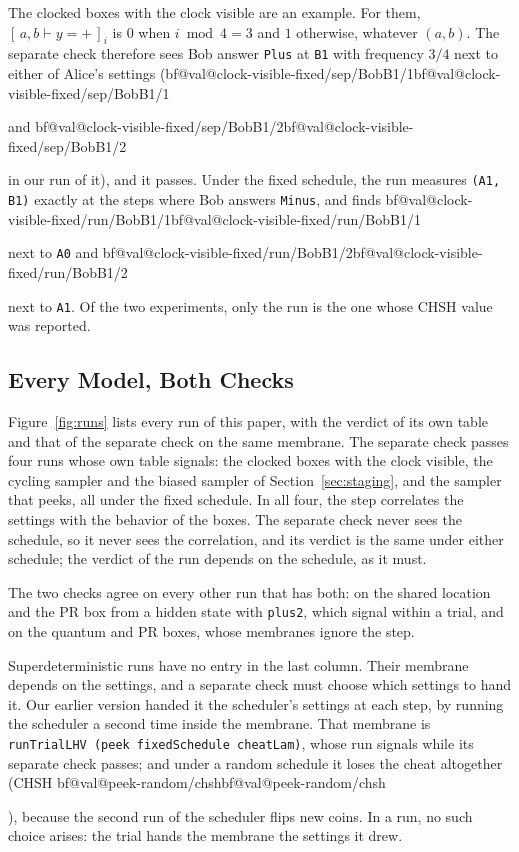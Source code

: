 \documentclass[11pt]{article}
\makeatletter
\newcommand{\hs}{\lstinline[style=hask,basicstyle=\ttfamily,frame=none]}
\newcommand{\val}[1]{\ifcsname bf@val@#1\endcsname\csname bf@val@#1\endcsname
  \else\PackageError{paper}{No value #1 in generated/values.tex}{}\fi}
\newcommand{\pr}[2]{[\,#1 \vdash #2\,]}
\newcommand{\yp}{y{=}{+}}
\makeatother
\begin{document}
The clocked boxes with the clock visible are an example. For them, $\pr{a, b}{\yp}_i$ is $0$ when $i \bmod 4 = 3$ and $1$ otherwise, whatever $(a, b)$. The separate check therefore sees Bob answer \hs|Plus| at \hs|B1| with frequency $3/4$ next to either of Alice's settings (\val{clock-visible-fixed/sep/BobB1/1} and \val{clock-visible-fixed/sep/BobB1/2} in our run of it), and it passes. Under the fixed schedule, the run measures \hs|(A1, B1)| exactly at the steps where Bob answers \hs|Minus|, and finds \val{clock-visible-fixed/run/BobB1/1} next to \hs|A0| and \val{clock-visible-fixed/run/BobB1/2} next to \hs|A1|. Of the two experiments, only the run is the one whose CHSH value was reported.

\subsection{Every Model, Both Checks}

Figure~\ref{fig:runs} lists every run of this paper, with the verdict of its own table and that of the separate check on the same membrane. The separate check passes four runs whose own table signals: the clocked boxes with the clock visible, the cycling sampler and the biased sampler of Section~\ref{sec:staging}, and the sampler that peeks, all under the fixed schedule. In all four, the step correlates the settings with the behavior of the boxes. The separate check never sees the schedule, so it never sees the correlation, and its verdict is the same under either schedule; the verdict of the run depends on the schedule, as it must.

The two checks agree on every other run that has both: on the shared location and the PR box from a hidden state with \hs|plus2|, which signal within a trial, and on the quantum and PR boxes, whose membranes ignore the step.

Superdeterministic runs have no entry in the last column. Their membrane depends on the settings, and a separate check must choose which settings to hand it. Our earlier version handed it the scheduler's settings at each step, by running the scheduler a second time inside the membrane. That membrane is \hs|runTrialLHV (peek fixedSchedule cheatLam)|, whose run signals while its separate check passes; and under a random schedule it loses the cheat altogether (CHSH \val{peek-random/chsh}), because the second run of the scheduler flips new coins. In a run, no such choice arises: the trial hands the membrane the settings it drew.
\end{document}
